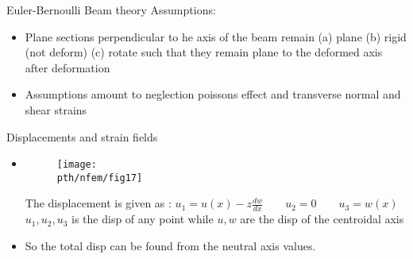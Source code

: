 	\begin{frame}{Euler-Bernoulli Beam theory}
		Assumptions:
		\begin{itemize}
			\item Plane sections perpendicular to he axis of the beam remain (a) plane (b) rigid (not deform) (c) rotate such that they remain plane to the deformed axis after deformation
			\item  Assumptions amount to neglection poissons effect and transverse normal and shear strains
		\end{itemize}
	\end{frame}


	\begin{frame}{Displacements and strain fields}
		\begin{itemize}
			\item 		
			\begin{figure}
				\centering
				\texttt{[image: \\pth/nfem/fig17]} 		
			\end{figure}
			The displacement is given as : $u_1 = u(x) - z\frac{d w}{d x} \qquad u_2 = 0 \qquad u_3 = w(x)$ \\
			$u_1,u_2,u_3$ is the disp of any point while $u,w$ are the disp of the centroidal axis \\
			\item So the total disp can be found from the neutral axis values. 		
			
		\end{itemize}
	\end{frame}



